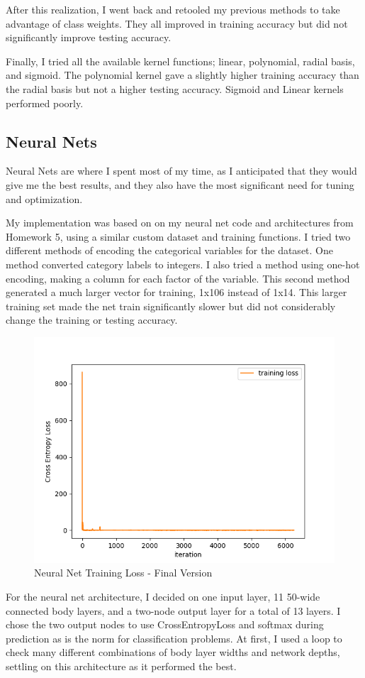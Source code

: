 \documentclass{article}
\begin{document}
After this realization, I went back and retooled my previous methods to take advantage of class weights. They all improved in training accuracy but did not significantly improve testing accuracy. 

Finally, I tried all the available kernel functions; linear, polynomial, radial basis, and sigmoid. The polynomial kernel gave a slightly higher training accuracy than the radial basis but not a higher testing accuracy. Sigmoid and Linear kernels performed poorly. 

\subsection{Neural Nets}

Neural Nets are where I spent most of my time, as I anticipated that they would give me the best results, and they also have the most significant need for tuning and optimization. 

My implementation was based on on my neural net code and architectures from Homework 5, using a similar custom dataset and training functions. I tried two different methods of encoding the categorical variables for the dataset. One method converted category labels to integers. I also tried a method using one-hot encoding, making a column for each factor of the variable. This second method generated a much larger vector for training, 1x106 instead of 1x14. This larger training set made the net train significantly slower but did not considerably change the training or testing accuracy.

\begin{figure}[h]
    \centering
    \includegraphics[width=0.4\linewidth]{img/nn_loss.png}
    \caption{Neural Net Training Loss - Final Version}
    \label{fig:nn}
\end{figure}

For the neural net architecture, I decided on one input layer, 11 50-wide connected body layers, and a two-node output layer for a total of 13 layers. I chose the two output nodes to use CrossEntropyLoss and softmax during prediction as is the norm for classification problems. At first, I used a loop to check many different combinations of body layer widths and network depths, settling on this architecture as it performed the best. 
\end{document}
